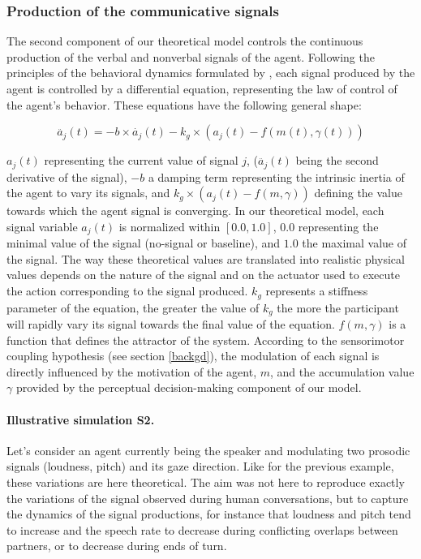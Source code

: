 \subsubsection{Production of the communicative signals}

The second component of our theoretical model controls the continuous production of the verbal and nonverbal signals of the agent.
Following the principles of the behavioral dynamics formulated by \citep{warren_dynamics_2006}, each signal produced by the agent is controlled by a differential equation, representing the law of control of the agent's behavior. These equations have the following general shape: 

\begin{equation}
  \ddot{a_j}(t)= -b\times\dot{a_j}(t) - k_g \times(a_j(t) - f(m(t),\gamma(t)))
  \label{signal_control}
\end{equation}

$a_j(t)$ representing the current value of signal $j$, ($\ddot{a_j}(t)$ being the second derivative of the signal), $-b$ a damping term representing the intrinsic inertia of the agent to vary its signals, and $k_g\times(a_j(t)-f(m,\gamma))$ defining the value towards which the agent signal is converging. In our theoretical model, each signal variable $a_j(t)$ is normalized within $ [0.0,1.0] $, $0.0$ representing the minimal value of the signal (no-signal or baseline), and $1.0$ the maximal value of the signal. The way these theoretical values are translated into realistic physical values depends on the nature of the signal and on the actuator used to execute the action corresponding to the signal produced. 
$k_g$ represents a stiffness parameter of the equation, the greater the value of $k_g$ the more the participant will rapidly vary its signal towards the final value of the equation. 
$f(m,\gamma)$ is a function that defines the attractor of the system. According to the sensorimotor coupling hypothesis (see section \ref{backgd}), the modulation of each signal is directly influenced by the motivation of the agent, $m$, and the accumulation value $\gamma$ provided by the perceptual decision-making component of our model.

\paragraph{Illustrative simulation S2.} Let's consider an agent currently being the speaker and modulating two prosodic signals (loudness, pitch) and its gaze direction. 
Like for the previous example, these variations are here theoretical.
The aim was not here to reproduce exactly the variations of the signal observed during human conversations, but to capture the dynamics of the signal productions, for instance that loudness and pitch tend to increase and the speech rate to decrease during conflicting overlaps between partners, or to decrease during ends of turn. 

